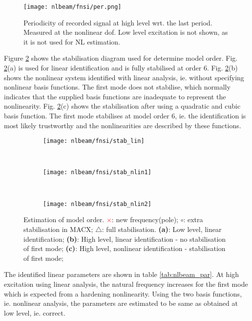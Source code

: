 \begin{figure}[!ht]
  \centering
  \texttt{[image: nlbeam/fnsi/per.png]}
  \caption{Periodicity of recorded signal at high level wrt. the last period.
    Measured at the nonlinear dof. Low level excitation is not shown, as it is
    not used for NL estimation.}
  \label{fig:nlbeam_per}
\end{figure}

Figure \ref{fig:nlbeam_stab} shows the stabilisation diagram used for determine
model order. Fig. \ref{fig:nlbeam_stab}(a) is used for linear identification and
is fully stabilised at order 6. Fig. \ref{fig:nlbeam_stab}(b) shows the
nonlinear system identified with linear analysis, ie. without specifying
nonlinear basis functions. The first mode does not stabilise, which normally
indicates that the supplied basis functions are inadequate to represent the
nonlinearity. Fig. \ref{fig:nlbeam_stab}(c) shows the stabilisation after
using a quadratic and cubic basis function. The first mode stabilises at
model order 6, ie. the identification is most likely trustworthy and the
nonlinearities are described by these functions.

\begin{figure}
  \centering
  \begin{subfigure}[b]{0.45\textwidth}
    \texttt{[image: nlbeam/fnsi/stab\_lin]}
    \caption{}
  \end{subfigure}
  ~
  \begin{subfigure}[b]{0.45\textwidth}
    \texttt{[image: nlbeam/fnsi/stab\_nlin1]}
    \caption{}
  \end{subfigure}
  \\
  \begin{subfigure}[b]{0.45\textwidth}
    \texttt{[image: nlbeam/fnsi/stab\_nlin2]}
    \caption{}
  \end{subfigure}
  \caption{Estimation of model order.
    \textcolor{red}{$\pmb\times$}: new frequency(pole);
    $\pmb\circ$: extra stabilisation in MACX;
    $\pmb\triangle$: full stabilisation.
    \textbf{(a)}: Low level, linear identification;
    \textbf{(b)}: High level, linear identification - no stabilisation of first mode;
    \textbf{(c)}: High level, nonlinear identification - stabilisation of first mode;
  }
  \label{fig:nlbeam_stab}
\end{figure}

The identified linear parameters are shown in table \ref{tab:nlbeam_par}. At
high excitation using linear analysis, the natural frequency increases for the
first mode which is expected from a hardening nonlinearity.
Using the two basis functions, ie. nonlinear analysis, the parameters are
estimated to be same as obtained at low level, ie. correct.

